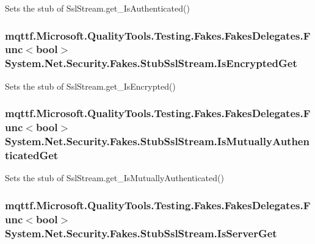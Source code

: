 Sets the stub of Ssl\-Stream.\-get\-\_\-\-Is\-Authenticated()

\hypertarget{class_system_1_1_net_1_1_security_1_1_fakes_1_1_stub_ssl_stream_aba518d8908ca9dcb29b878d19265b96f}{
\subsubsection[{Is\-Encrypted\-Get}]{\setlength{\rightskip}{0pt plus 5cm}mqttf.\-Microsoft.\-Quality\-Tools.\-Testing.\-Fakes.\-Fakes\-Delegates.\-Func$<$bool$>$ System.\-Net.\-Security.\-Fakes.\-Stub\-Ssl\-Stream.\-Is\-Encrypted\-Get}}\label{class_system_1_1_net_1_1_security_1_1_fakes_1_1_stub_ssl_stream_aba518d8908ca9dcb29b878d19265b96f}


Sets the stub of Ssl\-Stream.\-get\-\_\-\-Is\-Encrypted()

\hypertarget{class_system_1_1_net_1_1_security_1_1_fakes_1_1_stub_ssl_stream_ade144202e141734b292234c6b98d2044}{
\subsubsection[{Is\-Mutually\-Authenticated\-Get}]{\setlength{\rightskip}{0pt plus 5cm}mqttf.\-Microsoft.\-Quality\-Tools.\-Testing.\-Fakes.\-Fakes\-Delegates.\-Func$<$bool$>$ System.\-Net.\-Security.\-Fakes.\-Stub\-Ssl\-Stream.\-Is\-Mutually\-Authenticated\-Get}}\label{class_system_1_1_net_1_1_security_1_1_fakes_1_1_stub_ssl_stream_ade144202e141734b292234c6b98d2044}


Sets the stub of Ssl\-Stream.\-get\-\_\-\-Is\-Mutually\-Authenticated()

\hypertarget{class_system_1_1_net_1_1_security_1_1_fakes_1_1_stub_ssl_stream_ac1b6c42f284dfd4afbf4acd0f0a6370b}{
\subsubsection[{Is\-Server\-Get}]{\setlength{\rightskip}{0pt plus 5cm}mqttf.\-Microsoft.\-Quality\-Tools.\-Testing.\-Fakes.\-Fakes\-Delegates.\-Func$<$bool$>$ System.\-Net.\-Security.\-Fakes.\-Stub\-Ssl\-Stream.\-Is\-Server\-Get}}\label{class_system_1_1_net_1_1_security_1_1_fakes_1_1_stub_ssl_stream_ac1b6c42f284dfd4afbf4acd0f0a6370b}


